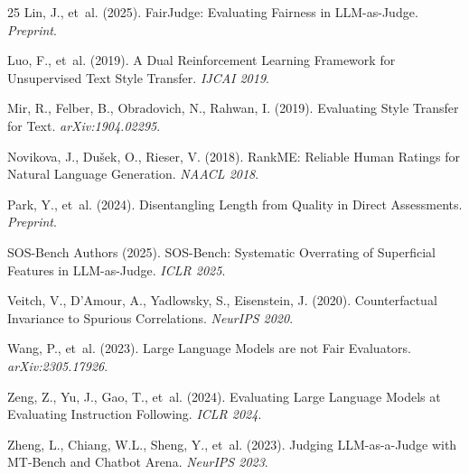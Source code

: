 \documentclass[11pt,a4paper]{article}
\begin{document}
\begin{thebibliography}{25}
Lin, J., et~al. (2025).
\newblock FairJudge: Evaluating Fairness in LLM-as-Judge.
\newblock \emph{Preprint}.

Luo, F., et~al. (2019).
\newblock A Dual Reinforcement Learning Framework for Unsupervised Text Style Transfer.
\newblock \emph{IJCAI 2019}.

Mir, R., Felber, B., Obradovich, N., Rahwan, I. (2019).
\newblock Evaluating Style Transfer for Text.
\newblock \emph{arXiv:1904.02295}.

Novikova, J., Du\v{s}ek, O., Rieser, V. (2018).
\newblock RankME: Reliable Human Ratings for Natural Language Generation.
\newblock \emph{NAACL 2018}.

Park, Y., et~al. (2024).
\newblock Disentangling Length from Quality in Direct Assessments.
\newblock \emph{Preprint}.

SOS-Bench Authors (2025).
\newblock SOS-Bench: Systematic Overrating of Superficial Features in LLM-as-Judge.
\newblock \emph{ICLR 2025}.

Veitch, V., D'Amour, A., Yadlowsky, S., Eisenstein, J. (2020).
\newblock Counterfactual Invariance to Spurious Correlations.
\newblock \emph{NeurIPS 2020}.

Wang, P., et~al. (2023).
\newblock Large Language Models are not Fair Evaluators.
\newblock \emph{arXiv:2305.17926}.

Zeng, Z., Yu, J., Gao, T., et~al. (2024).
\newblock Evaluating Large Language Models at Evaluating Instruction Following.
\newblock \emph{ICLR 2024}.

Zheng, L., Chiang, W.L., Sheng, Y., et~al. (2023).
\newblock Judging LLM-as-a-Judge with MT-Bench and Chatbot Arena.
\newblock \emph{NeurIPS 2023}.

\end{thebibliography}
\end{document}
